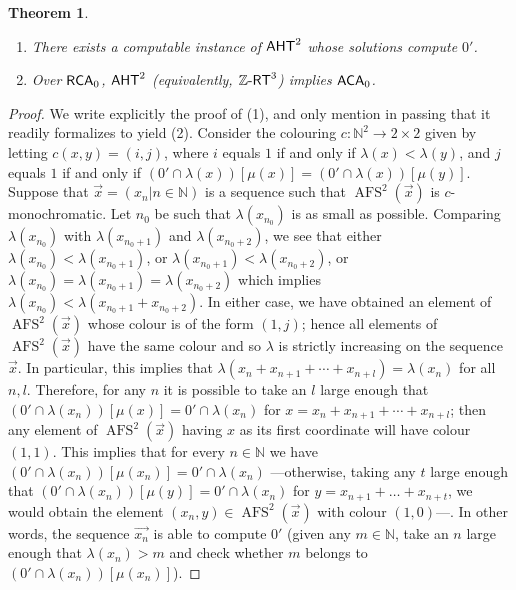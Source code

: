 \documentclass[10pt,a4paper]{amsart}
\newcommand{\zrt}{\mathnormal{\mathbb Z\text{-}\mathsf{RT}}}
\newcommand{\aht}{\mathnormal{\mathsf{AHT}}}
\newcommand{\rca}{\mathnormal{\mathsf{RCA}}_0}
\newcommand{\aca}{\mathnormal{\mathsf{ACA}}_0}
\DeclareMathOperator{\afs}{AFS}
\newtheorem{theorem}{Theorem}%
\theoremstyle{definition}
\begin{document}
\begin{theorem}\label{lower-bound}\hfill
\begin{enumerate}
\item There exists a computable instance of $\aht^2$ whose solutions compute $0'$.
\item Over $\rca$, $\aht^2$ (equivalently, $\zrt^3$) implies $\aca$.
\end{enumerate}
\end{theorem}



\begin{proof}
We write explicitly the proof of (1), and only mention in passing that it readily formalizes to yield (2). Consider the colouring $c:\mathbb N^2\longrightarrow 2\times 2$ given by letting $c(x,y)=(i,j)$, where $i$ equals $1$ if and only if $\lambda(x)<\lambda(y)$, and $j$ equals $1$ if and only if $(0'\cap\lambda(x))[\mu(x)]=(0'\cap\lambda(x))[\mu(y)]$. Suppose that $\vec{x}=(x_n\big|n\in\mathbb N)$ is a sequence such that $\afs^2(\vec{x})$ is $c$-monochromatic. Let $n_0$ be such that $\lambda(x_{n_0})$ is as small as possible. Comparing $\lambda(x_{n_0})$ with $\lambda(x_{n_0+1})$ and $\lambda(x_{n_0+2})$, we see that either $\lambda(x_{n_0})<\lambda(x_{n_0+1})$, or $\lambda(x_{n_0+1})<\lambda(x_{n_0+2})$, or $\lambda(x_{n_0})=\lambda(x_{n_0+1})=\lambda(x_{n_0+2})$ which implies $\lambda(x_{n_0})<\lambda(x_{n_0+1}+x_{n_0+2})$. In either case, we have obtained an element of $\afs^2(\vec{x})$ whose colour is of the form $(1,j)$; hence all elements of $\afs^2(\vec{x})$ have the same colour and so $\lambda$ is strictly increasing on the sequence $\vec{x}$. In particular, this implies that $\lambda(x_n+x_{n+1}+\cdots+x_{n+l})=\lambda(x_n)$ for all $n,l$. Therefore, for any $n$ it is possible to take an $l$ large enough that $(0'\cap\lambda(x_n))[\mu(x)]=0'\cap\lambda(x_n)$ for $x=x_n+x_{n+1}+\cdots+x_{n+l}$; then any element of $\afs^2(\vec{x})$ having $x$ as its first coordinate will have colour $(1,1)$. This implies that for every $n\in\mathbb N$ we have $(0'\cap\lambda(x_n))[\mu(x_n)]=0'\cap\lambda(x_n)$ ---otherwise, taking any $t$ large enough that $(0'\cap\lambda(x_n))[\mu(y)]=0'\cap\lambda(x_n)$ for $y=x_{n+1}+\ldots+x_{n+t}$, we would obtain the element $(x_n,y)\in\afs^2(\vec{x})$ with colour $(1,0)$---. In other words, the sequence $\vec{x_n}$ is able to compute $0'$ (given any $m\in\mathbb N$, take an $n$ large enough that $\lambda(x_n)>m$ and check whether $m$ belongs to $(0'\cap\lambda(x_n))[\mu(x_n)]$).
\end{proof}
\end{document}
